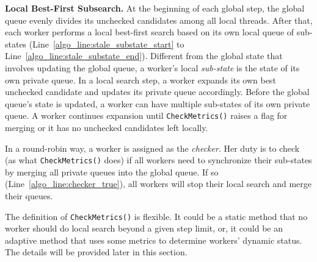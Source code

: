 \noindent\textbf{Local Best-First Subsearch.}
At the beginning of each global step, the global queue evenly divides its unchecked candidates among all local threads.
After that, each worker performs a local best-first search based on its own local queue of sub-states (Line~\ref{algo_line:stale_substate_start} to Line~\ref{algo_line:stale_substate_end}).
Different from the global state that involves updating the global queue, a worker's local \emph{sub-state} is the state of its own private queue.
In a local search step, a worker expands its own best unchecked candidate and updates its private queue accordingly.
Before the global queue's state is updated, a worker can have multiple sub-states of its own private queue.
A worker continues expansion until \texttt{CheckMetrics()} raises a flag for merging
or it has no unchecked candidates left locally.

In a round-robin way, a worker is assigned as the \emph{checker}. 
Her duty is to check (as what \texttt{CheckMetrics()} does) if all workers need to synchronize their sub-states by merging all private queues into the global queue.
If so (Line~\ref{algo_line:checker_true}), all workers will stop their local search and merge their queues.

The definition of \texttt{CheckMetrics()} is flexible. 
It could be a static method that no worker should do local search beyond a given step limit, or, it could be an adaptive method that uses some metrics to determine workers' dynamic status.
The details will be provided later in this section.





